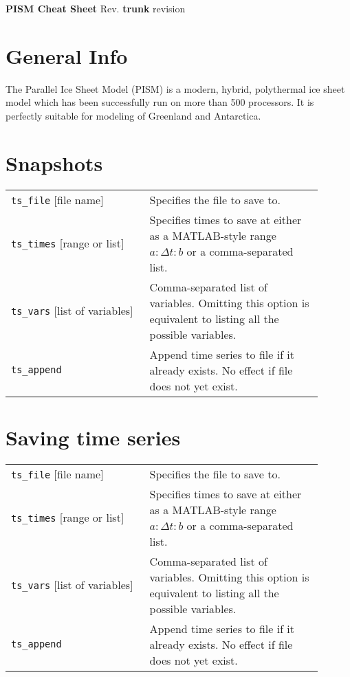 \documentclass[10pt,landscape]{article}
\newcommand{\PISMREV}{\textbf{trunk} revision }
\begin{document}
\begin{center}
     \Large{\textbf{PISM Cheat Sheet} Rev. \PISMREV}
\end{center}


\begin{multicols*}{3}


\setlength{\columnseprule}{0.25pt}
\setlength{\premulticols}{1pt}
\setlength{\postmulticols}{1pt}
\setlength{\multicolsep}{1pt}
\setlength{\columnsep}{2pt}

\section{General Info}

The Parallel Ice Sheet Model (PISM) is a modern, hybrid, polythermal
ice sheet model which has been successfully run on more than 500
processors. It is perfectly suitable for modeling of Greenland and Antarctica.


\section{Snapshots}

\begin{tabular}{@{}p{0.4\linewidth}p{0.5\linewidth}@{}}
  \texttt{ts_file} [file name] & Specifies the file to save to.\\
  \texttt{ts_times} [range or list] & Specifies times to save at either as a MATLAB-style range $a:\Delta t:b$ or a comma-separated list. \\
  \texttt{ts_vars} [list of variables] & Comma-separated list of variables. Omitting this option is equivalent to listing all the possible variables.\\
  \texttt{ts_append} & Append time series to file if it already exists.  No effect if file does not yet exist.
\end{tabular}


\section{Saving time series}

\begin{tabular}{@{}p{0.4\linewidth}p{0.5\linewidth}@{}}
  \texttt{ts_file} [file name] & Specifies the file to save to.\\
  \texttt{ts_times} [range or list] & Specifies times to save at either as a MATLAB-style range $a:\Delta t:b$ or a comma-separated list. \\
  \texttt{ts_vars} [list of variables] & Comma-separated list of variables. Omitting this option is equivalent to listing all the possible variables.\\
  \texttt{ts_append} & Append time series to file if it already exists.  No effect if file does not yet exist. \\
\end{tabular}




\end{multicols*}
\end{document}
